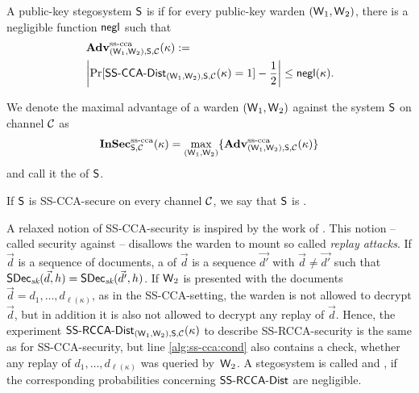 
A public-key stegosystem $\operatorname{\mathsf{S}}$ is  if for
every public-key warden $(\operatorname{\mathsf{W}}_{1},\operatorname{\mathsf{W}}_{2})$, there is a negligible function
$\operatorname{\mathsf{negl}}$ such that
\begin{align*}
  &\Adv_{(\Ward_{1},\Ward_{2}),\Steg,\chan}^{\sscca}(\kappa):=\\
  &\left|\Pr[\SSCCA-Dist_{(\Ward_{1},\Ward_{2}),\Steg,\chan}(\kappa) =
    1] -\frac{1}{2}\right| \leq \negl(\kappa).
\end{align*}

We denote the maximal advantage of a warden $(\operatorname{\mathsf{W}}_{1},\operatorname{\mathsf{W}}_{2})$
against the system $\operatorname{\mathsf{S}}$ on channel $\mathcal{C}$ as
\begin{align*}
\operatorname{\mathbf{InSec}}^{\operatorname{ss-cca}}_{\operatorname{\mathsf{S}},\mathcal{C}}(\kappa)=\max_{(\operatorname{\mathsf{W}}_{1},\operatorname{\mathsf{W}}_{2})}\{\operatorname{\mathbf{Adv}}^{\operatorname{ss-cca}}_{(\operatorname{\mathsf{W}}_{1},\operatorname{\mathsf{W}}_{2}),\operatorname{\mathsf{S}},\mathcal{C}}(\kappa)\}
\end{align*}
and call it the  of $\operatorname{\mathsf{S}}$.

If $\operatorname{\mathsf{S}}$ is \acs{SS-CCA}-secure on every channel $\mathcal{C}$, we say that
$\operatorname{\mathsf{S}}$ is . 

A relaxed notion of \acs{SS-CCA}-security is inspired by the work of
\citeauthor{canetti2003relaxing} \cite{canetti2003relaxing}. This notion
-- called security against  -- disallows the warden to mount so
called \emph{replay attacks}. If
$\vec{d}$ is a sequence of documents, a
 of $\vec{d}$ is a sequence
$\vec{d'}$ with $\vec{d}\neq \vec{d'}$
such that $\operatorname{\mathsf{SDec}}_{\textit{sk}}(\vec{d},h)=\operatorname{\mathsf{SDec}}_{\textit{sk}}(\vec{d'},h)$. If
$\operatorname{\mathsf{W}}_{2}$ is presented with the documents
$\vec{d}=d_{1},\ldots,d_{\ell(\kappa)}$, as in the \acs{SS-CCA}-setting,
the warden is not allowed to decrypt $\vec{d}$, but in addition it is also not
allowed to decrypt any replay of $\vec{d}$. Hence, the experiment
$\SSRCCA-Dist_{(\Ward_{1},\Ward_{2}),\Steg,\chan}(\kappa)$ to describe
\acs{SS-RCCA}-security is the same as for \acs{SS-CCA}-security, but
line \ref{alg:ss-cca:cond} also contains a check, whether any replay of
$d_{1},\ldots,d_{\ell(\kappa)}$ was queried by~$\operatorname{\mathsf{W}}_{2}$. A
stegosystem is called  and
, if the corresponding
probabilities concerning $\SSRCCA-Dist$ are negligible. 

